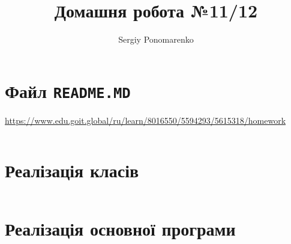 \documentclass[14pt]{extarticle}
\title{Домашня робота №11/12}
\author{Sergiy Ponomarenko}
\begin{document}
\maketitle


\section{Файл \texttt{README.MD}}




\begin{center}\scriptsize
\url{https://www.edu.goit.global/ru/learn/8016550/5594293/5615318/homework}
\end{center}

\inputminted[fontsize=\scriptsize,%
 numbersep = 1pt,%
 breaklines=true,%
 framesep=1mm,%
 baselinestretch=0.95,%
 bgcolor=gray!5,%
 fontsize=\scriptsize,%
 linenos]{text}{readme.md}

 \section{Реалізація класів}

 \inputminted[fontsize=\scriptsize,%
  numbersep = 1pt,%
  breaklines=true,%
  framesep=1mm,%
  baselinestretch=0.95,%
  bgcolor=gray!5,%
  fontsize=\footnotesize,%
  linenos]{python}{botmodule.py}

 \section{Реалізація основної програми}

\inputminted[fontsize=\scriptsize,%
 numbersep = 1pt,%
 breaklines=true,%
 framesep=1mm,%
 baselinestretch=0.95,%
 bgcolor=gray!5,%
 fontsize=\footnotesize,%
 linenos]{python}{console_bot.py}
\end{document}
